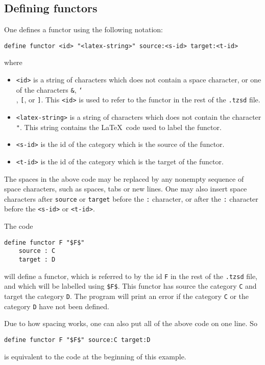 \documentclass{amsart}
\newcommand{\vlength}{0.2cm}
\begin{document}
\subsection{Defining functors}
One defines a functor using the following notation:
\vspace{\vlength}
\begin{verbatim}
define functor <id> "<latex-string>" source:<s-id> target:<t-id>
\end{verbatim}
\vspace{\vlength}
where
\begin{itemize}
    \item \texttt{<id>} is a string of characters which does not contain a space character,
        or one of the characters \texttt{\&}, \texttt{\char`\\}, \texttt{[}, or \texttt{]}.
        This \texttt{<id>} is used to refer to the functor in the rest of the \texttt{.tzsd}
            file.
    \item \texttt{<latex-string>} is a string of characters which does not contain the character
            \texttt{"}.
        This string contains the \LaTeX \ code used to label the functor.
    \item \texttt{<s-id>} is the id of the category which is the source of the functor.
    \item \texttt{<t-id>} is the id of the category which is the target of the functor.
\end{itemize}
The spaces in the above code may be replaced by any nonempty sequence of space characters, such as
    spaces, tabs or new lines.
One may also insert space characters after \texttt{source} or \texttt{target} before the \texttt{:}
    character, or after the \texttt{:} character before the \texttt{<s-id>} or \texttt{<t-id>}.
\begin{example}
The code
\vspace{\vlength}
\begin{verbatim}
define functor F "$F$"
    source : C
    target : D
\end{verbatim}
\vspace{\vlength}
will define a functor, which is referred to by the id \texttt{F} in the rest of the \texttt{.tzsd} file,
and which will be labelled using \texttt{\$F\$}.
This functor has source the category \texttt{C} and target the category \texttt{D}.
The program will print an error if the category \texttt{C} or the category \texttt{D} have not been
    defined.

Due to how spacing works, one can also put all of the above code on one line.
So
\vspace{\vlength}
\begin{verbatim}
define functor F "$F$" source:C target:D
\end{verbatim}
\vspace{\vlength}
is equivalent to the code at the beginning of this example.
\end{example}
\end{document}

